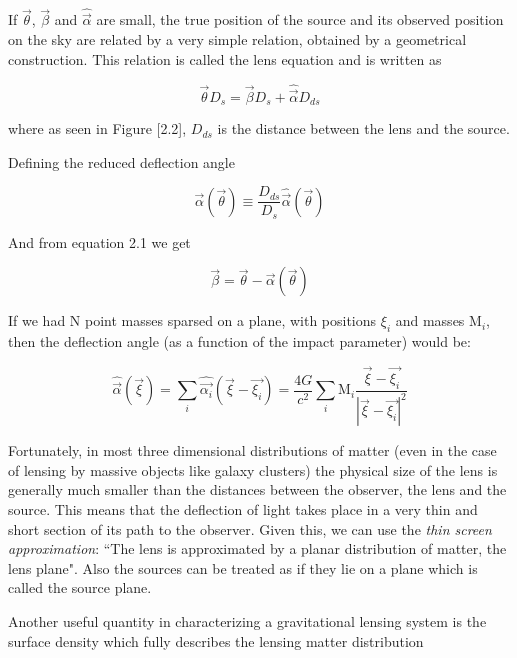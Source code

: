 If $\vec{\theta}$, $\vec{\beta}$ and $\hat{\vec{\alpha}}$ are small, the true position of the source and its observed position on the sky are related by a very simple relation, obtained by a geometrical construction. This relation is called the lens equation and is written as

\begin{equation}
\vec{\theta}D_s = \vec{\beta}D_s+ \hat{\vec{\alpha}}D_{ds}
\end{equation}

where as seen in Figure [2.2], $D_{ds}$ is the distance between the lens and the source.

Defining the reduced deflection angle

\begin{equation}
\vec{\alpha}(\vec{\theta})\equiv \frac{D_{ds}}{D_s}\hat{\vec{\alpha}}(\vec{\theta})
\end{equation}

And from equation 2.1 we get

\begin{equation}
\vec{\beta}=\vec{\theta}-\vec{\alpha}(\vec{\theta})
\end{equation}

 If we had N point masses sparsed on a plane, with positions $\xi_i$ and masses $\text{M}_{i}$, then the deflection angle (as a function of the impact parameter) would be:

\begin{equation}
\hat{\vec{\alpha}}(\vec{\xi})=\sum_{i}\hat{\vec{\alpha_{i}}}(\vec{\xi}-\vec{\xi_{i}})=\frac{4G}{c^{2}}\sum_{i}\textrm{M}_{i}\frac{\vec{\xi}-\vec{\xi_{i}}}{\left|\vec{\xi}-\vec{\xi_{i}}\right|^{2}}
\end{equation}

Fortunately, in most three dimensional distributions of matter (even in the case of lensing by massive objects like galaxy clusters) the physical size of the lens is generally much smaller than the distances between the observer, the lens and the source. This means that the deflection of light takes place in a very thin and short section of its path to the observer. Given this, we can use the \textit{thin screen approximation}: ``The lens is approximated by a planar distribution of matter, the lens plane". Also the sources can be treated as if they lie on a plane which is called the source plane.

Another useful quantity in characterizing a gravitational lensing system is the surface density which fully describes the lensing matter distribution

